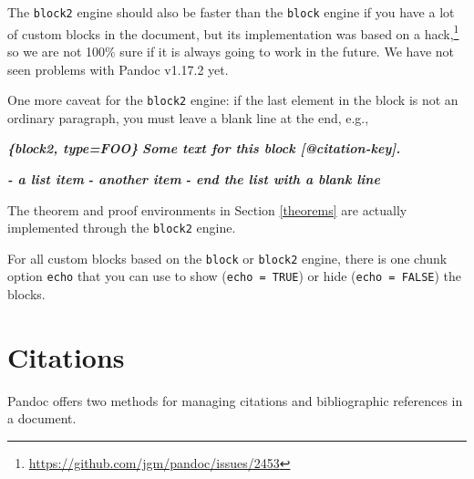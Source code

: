 \documentclass[
  12pt,
]{krantz}
\newenvironment{Shaded}{\begin{snugshade}}{\end{snugshade}}
\newcommand{\InformationTok}[1]{\textcolor[rgb]{0.56,0.35,0.01}{\textbf{\textit{#1}}}}
\renewcommand{\href}[2]{#2\footnote{\url{#1}}}
\theoremstyle{definition}
\theoremstyle{definition}
\theoremstyle{definition}
\theoremstyle{definition}
\theoremstyle{remark}
\begin{document}
The \texttt{block2} engine should also be faster than the \texttt{block} engine if you have a lot of custom blocks in the document, but its implementation was based on \href{https://github.com/jgm/pandoc/issues/2453}{a hack,} so we are not 100\% sure if it is always going to work in the future. We have not seen problems with Pandoc v1.17.2 yet.

One more caveat for the \texttt{block2} engine: if the last element in the block is not an ordinary paragraph, you must leave a blank line at the end, e.g.,

\begin{Shaded}
\begin{Highlighting}[]
\InformationTok{\textasciigrave{}\textasciigrave{}\textasciigrave{}\{block2, type=\textquotesingle{}FOO\textquotesingle{}\}}
\InformationTok{Some text for this block [@citation{-}key].}

\InformationTok{{-} a list item}
\InformationTok{{-} another item}
\InformationTok{{-} end the list with a blank line}

\InformationTok{\textasciigrave{}\textasciigrave{}\textasciigrave{}}
\end{Highlighting}
\end{Shaded}

The theorem and proof environments in Section \ref{theorems} are actually implemented through the \texttt{block2} engine.

For all custom blocks based on the \texttt{block} or \texttt{block2} engine, there is one chunk option \texttt{echo} that you can use to show (\texttt{echo\ =\ TRUE}) or hide (\texttt{echo\ =\ FALSE}) the blocks.

\hypertarget{citations}{%
\section{Citations}\label{citations}}

Pandoc offers two methods for managing citations and bibliographic references in a document.
\end{document}
